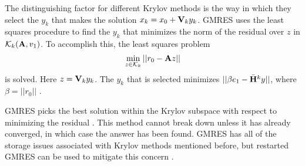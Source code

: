 The distinguishing factor for different Krylov methods is the way in which they select the $y_k$ that makes the solution $x_k = x_0 + \mathbf{V}_k y_k$. GMRES uses the least squares procedure to find the $y_k$ that minimizes the norm of the residual over $z$ in $\mathcal{K}_{k}(\mathbf{A}, v_1)$. To accomplish this, the least squares problem
%
\begin{equation}
  \min_{z \in \mathcal{K}_{k}} ||r_{0} - \mathbf{A}z||
  \label{eq:least-squares}
\end{equation} 
%
is solved. Here $z = \mathbf{V}_k y_k$. The $y_{k}$ that is selected minimizes $||\beta e_{1} - \bar{\mathbf{H}}^{k} y||$, where $\beta = ||r_{0}||$  \cite{Saad1986}. 

GMRES picks the best solution within the Krylov subspace with respect to minimizing the residual \cite{Ipsen1998}. %
This method cannot break down unless it has already converged, in which case the answer has been found. GMRES has all of the storage issues associated with Krylov methods mentioned before, but restarted GMRES can be used to mitigate this concern \cite{Saad1986}.


